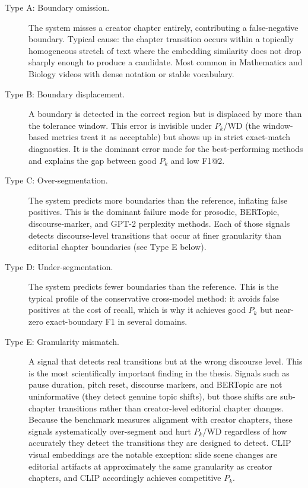 \begin{description}
  \item[Type A: Boundary omission.] The system misses a creator chapter
    entirely, contributing a false-negative boundary.
    Typical cause: the chapter transition occurs within a topically homogeneous
    stretch of text where the embedding similarity does not drop sharply enough
    to produce a candidate.
    Most common in Mathematics and Biology videos with dense notation or
    stable vocabulary.

  \item[Type B: Boundary displacement.] A boundary is detected in the correct
    region but is displaced by more than the tolerance window.
    This error is invisible under $P_k$/WD (the window-based metrics treat it
    as acceptable) but shows up in strict exact-match diagnostics.
    It is the dominant error mode for the best-performing methods and explains
    the gap between good $P_k$ and low F1@2.

  \item[Type C: Over-segmentation.] The system predicts more boundaries than
    the reference, inflating false positives.
    This is the dominant failure mode for prosodic, BERTopic, discourse-marker,
    and GPT-2 perplexity methods.
    Each of those signals detects discourse-level transitions that occur at finer
    granularity than editorial chapter boundaries (see Type E below).

  \item[Type D: Under-segmentation.] The system predicts fewer boundaries
    than the reference.
    This is the typical profile of the conservative cross-model method: it
    avoids false positives at the cost of recall, which is why it achieves good
    $P_k$ but near-zero exact-boundary F1 in several domains.

  \item[Type E: Granularity mismatch.] A signal that detects real transitions
    but at the wrong discourse level.
    This is the most scientifically important finding in the thesis.
    Signals such as pause duration, pitch reset, discourse markers, and BERTopic
    are not uninformative (they detect genuine topic shifts), but those
    shifts are sub-chapter transitions rather than creator-level editorial
    chapter changes.
    Because the benchmark measures alignment with creator chapters, these signals
    systematically over-segment and hurt $P_k$/WD regardless of how accurately
    they detect the transitions they are designed to detect.
    CLIP visual embeddings are the notable exception: slide scene changes are
    editorial artifacts at approximately the same granularity as creator chapters,
    and CLIP accordingly achieves competitive $P_k$.
\end{description}

